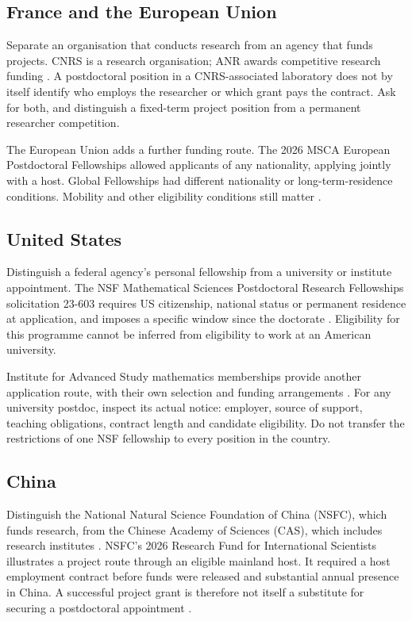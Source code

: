 \subsection{France and the European Union}
\label{subsection-gsf-funding-france}

Separate an organisation that conducts
research from
an agency that funds projects. CNRS is a
research
organisation; ANR awards competitive research
funding
\cite{gsf-cnrs,gsf-anr}.
A postdoctoral position in a CNRS-associated
laboratory
does not by itself identify who employs the
researcher
or which grant pays the contract.
Ask for both, and distinguish a fixed-term
project
position from a permanent researcher
competition.

The European Union adds a further funding
route.
The 2026 MSCA European Postdoctoral
Fellowships allowed
applicants of any nationality, applying
jointly with
a host. Global Fellowships had different
nationality
or long-term-residence conditions.
Mobility and other eligibility conditions
still matter
\cite{gsf-msca-2026}.

\subsection{United States}
\label{subsection-gsf-funding-united-states}

Distinguish a federal agency's personal
fellowship
from a university or institute appointment.
The NSF Mathematical Sciences Postdoctoral
Research
Fellowships solicitation 23-603 requires US
citizenship,
national status or permanent residence at
application,
and imposes a specific window since the
doctorate
\cite{gsf-nsf-msprf}.
Eligibility for this programme cannot be
inferred
from eligibility to work at an American
university.

Institute for Advanced Study mathematics
memberships
provide another application route, with their
own
selection and funding arrangements
\cite{gsf-ias}.
For any university postdoc, inspect its
actual notice:
employer, source of support, teaching
obligations,
contract length and candidate eligibility.
Do not transfer the restrictions of one NSF
fellowship
to every position in the country.

\subsection{China}
\label{subsection-gsf-funding-china}

Distinguish the National Natural Science
Foundation
of China (NSFC), which funds research, from
the
Chinese Academy of Sciences (CAS), which
includes
research institutes \cite{gsf-cas}.
NSFC's 2026 Research Fund for International
Scientists
illustrates a project route through an
eligible
mainland host. It required a host employment
contract
before funds were released and substantial
annual
presence in China. A successful project grant
is
therefore not itself a substitute for
securing a
postdoctoral appointment
\cite{gsf-nsfc-rfis-2026}.

